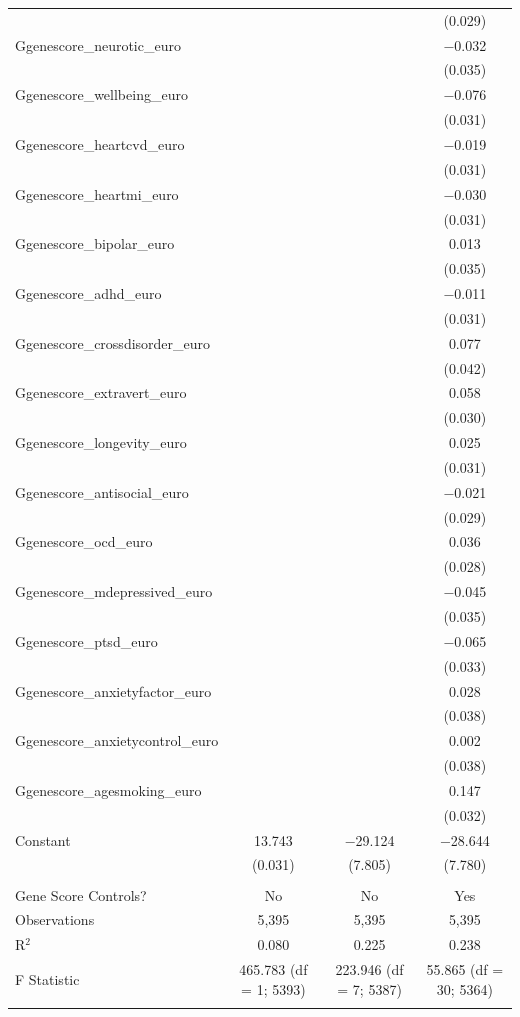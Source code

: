 \begin{tabular}{@{\extracolsep{5pt}}lccc}
  &  &  & (0.029) \\ 
  Ggenescore\_neurotic\_euro &  &  & $-$0.032 \\ 
  &  &  & (0.035) \\ 
  Ggenescore\_wellbeing\_euro &  &  & $-$0.076 \\ 
  &  &  & (0.031) \\ 
  Ggenescore\_heartcvd\_euro &  &  & $-$0.019 \\ 
  &  &  & (0.031) \\ 
  Ggenescore\_heartmi\_euro &  &  & $-$0.030 \\ 
  &  &  & (0.031) \\ 
  Ggenescore\_bipolar\_euro &  &  & 0.013 \\ 
  &  &  & (0.035) \\ 
  Ggenescore\_adhd\_euro &  &  & $-$0.011 \\ 
  &  &  & (0.031) \\ 
  Ggenescore\_crossdisorder\_euro &  &  & 0.077 \\ 
  &  &  & (0.042) \\ 
  Ggenescore\_extravert\_euro &  &  & 0.058 \\ 
  &  &  & (0.030) \\ 
  Ggenescore\_longevity\_euro &  &  & 0.025 \\ 
  &  &  & (0.031) \\ 
  Ggenescore\_antisocial\_euro &  &  & $-$0.021 \\ 
  &  &  & (0.029) \\ 
  Ggenescore\_ocd\_euro &  &  & 0.036 \\ 
  &  &  & (0.028) \\ 
  Ggenescore\_mdepressived\_euro &  &  & $-$0.045 \\ 
  &  &  & (0.035) \\ 
  Ggenescore\_ptsd\_euro &  &  & $-$0.065 \\ 
  &  &  & (0.033) \\ 
  Ggenescore\_anxietyfactor\_euro &  &  & 0.028 \\ 
  &  &  & (0.038) \\ 
  Ggenescore\_anxietycontrol\_euro &  &  & 0.002 \\ 
  &  &  & (0.038) \\ 
  Ggenescore\_agesmoking\_euro &  &  & 0.147 \\ 
  &  &  & (0.032) \\ 
  Constant & 13.743 & $-$29.124 & $-$28.644 \\ 
  & (0.031) & (7.805) & (7.780) \\ 
 \hline \\[-1.8ex] 
Gene Score Controls? & No & No & Yes \\ 
Observations & 5,395 & 5,395 & 5,395 \\ 
R$^{2}$ & 0.080 & 0.225 & 0.238 \\ 
F Statistic & 465.783 (df = 1; 5393) & 223.946 (df = 7; 5387) & 55.865 (df = 30; 5364) \\ 
\hline 
\hline \\[-1.8ex] 
\end{tabular} 

